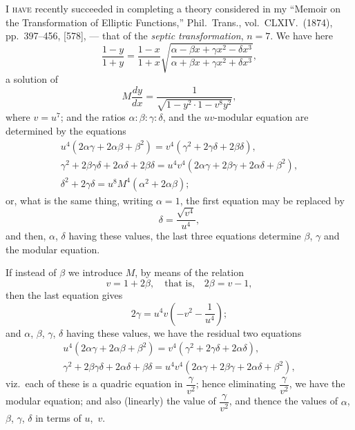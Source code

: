 \documentclass[12pt,a4paper]{article}
\begin{document}

\bigskip

\textsc{I have} recently succeeded in completing a theory considered in my ``Memoir on the Transformation of Elliptic Functions,'' Phil.\ Trans., vol.\ CLXIV.\ (1874), pp.\ 397--456, [578], --- that of the \textit{septic transformation}, $n = 7$. We have here
\[
\frac{1 - y}{1 + y} = \frac{1 - x}{1 + x}\sqrt{\frac{\alpha - \beta x + \gamma x^2 - \delta x^3}{\alpha + \beta x + \gamma x^2 + \delta x^3}},
\]
a solution of
\[
M\frac{dy}{dx} = \frac{1}{\sqrt{1 - y^2 \cdot 1 - v^8 y^2}},
\]
where $v = u^7$; and the ratios $\alpha : \beta : \gamma : \delta$, and the $uv$-modular equation are determined by the equations
\begin{gather*}
u^4(2\alpha\gamma + 2\alpha\beta + \beta^2) = v^4(\gamma^2 + 2\gamma\delta + 2\beta\delta),\\
\gamma^2 + 2\beta\gamma\delta + 2\alpha\delta + 2\beta\delta = u^4 v^4 (2\alpha\gamma + 2\beta\gamma + 2\alpha\delta + \beta^2),\\
\delta^2 + 2\gamma\delta = u^8 M^4 (\alpha^2 + 2\alpha\beta);
\end{gather*}
or, what is the same thing, writing $\alpha = 1$, the first equation may be replaced by
\[
\delta = \frac{\sqrt{v^4}}{u^4},
\]
and then, $\alpha$, $\delta$ having these values, the last three equations determine $\beta$, $\gamma$ and the modular equation.

If instead of $\beta$ we introduce $M$, by means of the relation
\[
v = 1 + 2\beta,\quad\text{that is,}\quad 2\beta = v - 1,
\]
then the last equation gives
\[
2\gamma = u^4 v \left(-v^2 - \frac{1}{u^4}\right);
\]
and $\alpha$, $\beta$, $\gamma$, $\delta$ having these values, we have the residual two equations
\begin{gather*}
u^4(2\alpha\gamma + 2\alpha\beta + \beta^2) = v^4(\gamma^2 + 2\gamma\delta + 2\alpha\delta),\\
\gamma^2 + 2\beta\gamma\delta + 2\alpha\delta + \beta\delta = u^4 v^4(2\alpha\gamma + 2\beta\gamma + 2\alpha\delta + \beta^2),
\end{gather*}
viz.\ each of these is a quadric equation in $\dfrac{\gamma}{v^2}$; hence eliminating $\dfrac{\gamma}{v^2}$, we have the modular equation; and also (linearly) the value of $\dfrac{\gamma}{v^2}$, and thence the values of $\alpha$, $\beta$, $\gamma$, $\delta$ in terms of $u$,~$v$.
\end{document}
